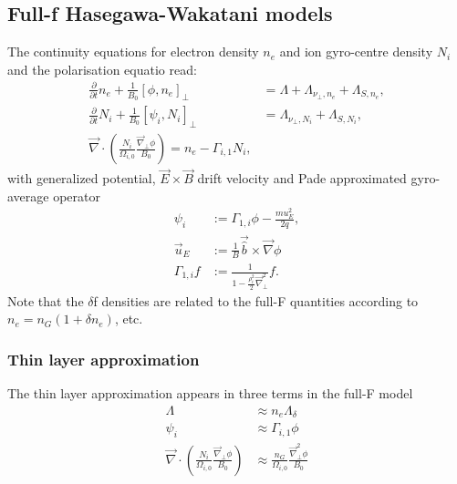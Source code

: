 \subsection{Full-f Hasegawa-Wakatani models}
The continuity equations for electron density \(n_e\) and ion gyro-centre density \(N_i\) and the polarisation equatio read:
\begin{align}
 \frac{\partial}{\partial t }n_e  + \frac{1}{B_0} \left[\phi, n_e\right]_{\perp} &=\Lambda + \Lambda_{\nu_\perp, n_e} +  \Lambda_{S, n_e}
,\\
\frac{\partial}{\partial t } N_i+\frac{1}{B_0} \left[\psi_i, N_i\right]_{\perp} &=\Lambda_{\nu_\perp, N_i} + \Lambda_{S, N_i} , \\
 \vec{\nabla} \cdot \left(\frac{N_i}{\Omega_{i,0}} \frac{\vec{\nabla}_\perp \phi}{B_0}\right)= n_e - \Gamma_{i,1} N_i, 
 \end{align}
with generalized potential, \(\vec{E} \times \vec{B}\) drift velocity and Pade approximated gyro-average operator
\begin{align}
  \psi_i&:= \Gamma_{1,i} \phi - \frac{m u_E^2}{2 q}, \\
  \vec{u}_E &:= \frac{1}{B} \vec{\hat{b}} \times \vec{\nabla} \phi \\
  \Gamma_{1,i} f&:= \frac{1}{1-\frac{\rho_i^2}{2}\vec{\nabla}_\perp^2} f. 
\end{align}
Note that the \(\delta\)f densities are related to the full-F quantities according to \(n_e = n_G (1+\delta n_e)\), etc.
\subsubsection{Thin layer approximation}
The thin layer approximation appears in three terms in the full-F model
\begin{align}
 \Lambda &\approx n_e \Lambda_\delta \\ 
 \psi_i &\approx \Gamma_{i,1}\phi \\
 \vec{\nabla} \cdot \left(\frac{N_i}{\Omega_{i,0}} \frac{\vec{\nabla}_\perp \phi}{B_0}\right) &\approx   \frac{n_G}{\Omega_{i,0}} \frac{\vec{\nabla}_\perp^2 \phi}{B_0}
\end{align}

